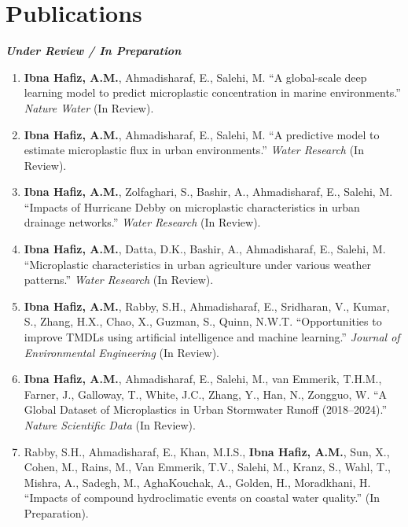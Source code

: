 \documentclass[a4paper,11pt]{article}
\begin{document}
\section{\textbf{Publications}}
\vspace{1mm}

\textbf{\textit{Under Review / In Preparation}}
\vspace{1mm}
\small{
\begin{enumerate}[leftmargin=*, labelsep=0.5em, itemsep=1.5mm]

\item \textbf{Ibna Hafiz, A.M.}, Ahmadisharaf, E., Salehi, M. ``A global-scale deep learning model to predict microplastic concentration in marine environments.'' \textit{Nature Water} (In Review).

\item \textbf{Ibna Hafiz, A.M.}, Ahmadisharaf, E., Salehi, M. ``A predictive model to estimate microplastic flux in urban environments.'' \textit{Water Research} (In Review).

\item \textbf{Ibna Hafiz, A.M.}, Zolfaghari, S., Bashir, A., Ahmadisharaf, E., Salehi, M. ``Impacts of Hurricane Debby on microplastic characteristics in urban drainage networks.'' \textit{Water Research} (In Review).

\item \textbf{Ibna Hafiz, A.M.}, Datta, D.K., Bashir, A., Ahmadisharaf, E., Salehi, M. ``Microplastic characteristics in urban agriculture under various weather patterns.'' \textit{Water Research} (In Review).

\item \textbf{Ibna Hafiz, A.M.}, Rabby, S.H., Ahmadisharaf, E., Sridharan, V., Kumar, S., Zhang, H.X., Chao, X., Guzman, S., Quinn, N.W.T. ``Opportunities to improve TMDLs using artificial intelligence and machine learning.'' \textit{Journal of Environmental Engineering} (In Review).

\item \textbf{Ibna Hafiz, A.M.}, Ahmadisharaf, E., Salehi, M., van Emmerik, T.H.M., Farner, J., Galloway, T., White, J.C., Zhang, Y., Han, N., Zongguo, W. ``A Global Dataset of Microplastics in Urban Stormwater Runoff (2018--2024).'' \textit{Nature Scientific Data} (In Review).

\item Rabby, S.H., Ahmadisharaf, E., Khan, M.I.S., \textbf{Ibna Hafiz, A.M.}, Sun, X., Cohen, M., Rains, M., Van Emmerik, T.V., Salehi, M., Kranz, S., Wahl, T., Mishra, A., Sadegh, M., AghaKouchak, A., Golden, H., Moradkhani, H. ``Impacts of compound hydroclimatic events on coastal water quality.'' (In Preparation).

\end{enumerate}
}
\vspace{1mm}
\end{document}
